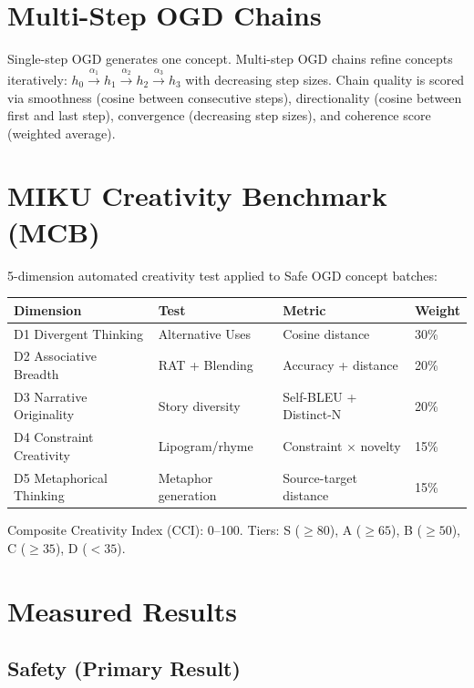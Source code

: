 \documentclass[11pt]{article}
\begin{document}
\section{Multi-Step OGD Chains}

Single-step OGD generates one concept. Multi-step OGD chains refine concepts iteratively: $h_0 \xrightarrow{\alpha_1} h_1 \xrightarrow{\alpha_2} h_2 \xrightarrow{\alpha_3} h_3$ with decreasing step sizes. Chain quality is scored via smoothness (cosine between consecutive steps), directionality (cosine between first and last step), convergence (decreasing step sizes), and coherence score (weighted average).

\section{MIKU Creativity Benchmark (MCB)}

5-dimension automated creativity test applied to Safe OGD concept batches:

\begin{table}[h]\centering
\begin{tabular}{llll}\toprule
Dimension & Test & Metric & Weight \\\midrule
D1 Divergent Thinking & Alternative Uses & Cosine distance & 30\% \\
D2 Associative Breadth & RAT + Blending & Accuracy + distance & 20\% \\
D3 Narrative Originality & Story diversity & Self-BLEU + Distinct-N & 20\% \\
D4 Constraint Creativity & Lipogram/rhyme & Constraint $\times$ novelty & 15\% \\
D5 Metaphorical Thinking & Metaphor generation & Source-target distance & 15\% \\\bottomrule
\end{tabular}
\end{table}

Composite Creativity Index (CCI): 0--100. Tiers: S ($\ge 80$), A ($\ge 65$), B ($\ge 50$), C ($\ge 35$), D ($<35$).


\section{Measured Results}

\subsection{Safety (Primary Result)}
\end{document}
